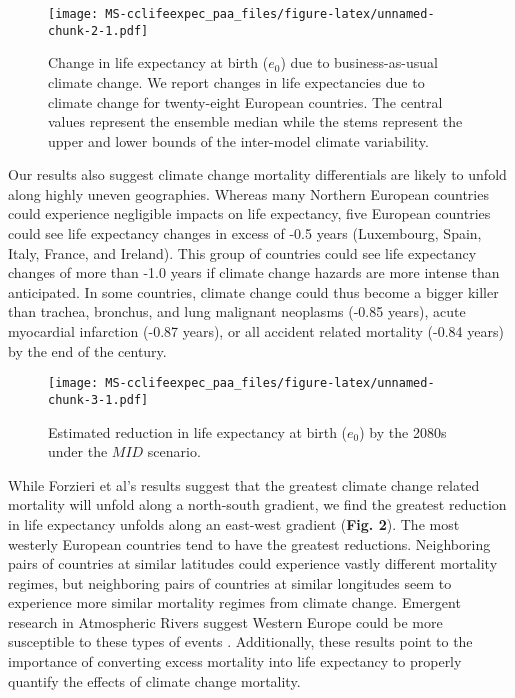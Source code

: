 \documentclass[12pt,]{article}
\makeatletter
\def\maxwidth{\ifdim\Gin@nat@width>\linewidth\linewidth
\else\Gin@nat@width\fi}
\let\Oldincludegraphics\includegraphics
\renewcommand{\includegraphics}[1]{\Oldincludegraphics[width=\maxwidth]{#1}}
\makeatother
\begin{document}
\begin{figure}
\centering
\texttt{[image: MS-cclifeexpec\_paa\_files/figure-latex/unnamed-chunk-2-1.pdf]}
\caption{Change in life expectancy at birth (\(e_0\)) due to
business-as-usual climate change. We report changes in life expectancies
due to climate change for twenty-eight European countries. The central
values represent the ensemble median while the stems represent the upper
and lower bounds of the inter-model climate variability.}
\end{figure}

Our results also suggest climate change mortality differentials are
likely to unfold along highly uneven geographies. Whereas many Northern
European countries could experience negligible impacts on life
expectancy, five European countries could see life expectancy changes in
excess of -0.5 years (Luxembourg, Spain, Italy, France, and Ireland).
This group of countries could see life expectancy changes of more than
-1.0 years if climate change hazards are more intense than anticipated.
In some countries, climate change could thus become a bigger killer than
trachea, bronchus, and lung malignant neoplasms (-0.85 years), acute
myocardial infarction (-0.87 years), or all accident related mortality
(-0.84 years) \citep{arias2013united} by the end of the century.

\begin{figure}
\centering
\texttt{[image: MS-cclifeexpec\_paa\_files/figure-latex/unnamed-chunk-3-1.pdf]}
\caption{Estimated reduction in life expectancy at birth (\(e_0\)) by
the 2080s under the \(MID\) scenario.}
\end{figure}

While Forzieri et al's \citep{forzieri2017increasing} results suggest
that the greatest climate change related mortality will unfold along a
north-south gradient, we find the greatest reduction in life expectancy
unfolds along an east-west gradient (\textbf{Fig. 2}). The most westerly
European countries tend to have the greatest reductions. Neighboring
pairs of countries at similar latitudes could experience vastly
different mortality regimes, but neighboring pairs of countries at
similar longitudes seem to experience more similar mortality regimes
from climate change. Emergent research in Atmospheric Rivers suggest
Western Europe could be more susceptible to these types of events
\citep{ramos2015daily}. Additionally, these results point to the
importance of converting excess mortality into life expectancy to
properly quantify the effects of climate change mortality.
\end{document}

